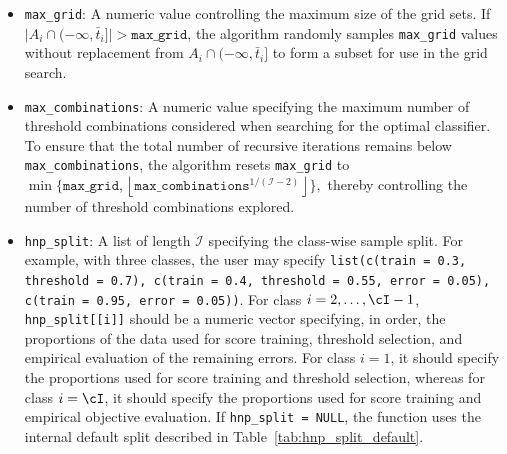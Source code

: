 \begin{itemize}
\item \texttt{max\_grid}: A numeric value controlling the maximum size of the grid sets. If \(\lvert A_i \cap (-\infty, \bar{t}_i] \rvert > \texttt{max\_grid}\), the algorithm randomly samples \texttt{max\_grid} values without replacement from \(A_i \cap (-\infty, \bar{t}_i]\) to form a subset for use in the grid search.



\item \texttt{max\_combinations}: A numeric value specifying the maximum number of threshold combinations considered when searching for the optimal classifier. To ensure that the total number of recursive iterations remains below \texttt{max\_combinations}, the algorithm resets \texttt{max\_grid} to
\(
\min\{\texttt{max\_grid}, \left\lfloor \texttt{max\_combinations}^{1/(\mathcal{I}-2)} \right\rfloor \},
\)
thereby controlling the number of threshold combinations explored.



\item \texttt{hnp\_split}: A list of length \(\mathcal{I}\) specifying the class-wise sample split. For example, with three classes, the user may specify
\texttt{list(c(train = 0.3, threshold = 0.7), c(train = 0.4, threshold = 0.55, error = 0.05), c(train = 0.95, error = 0.05))}. For class \(i = 2, \ldots, \cI - 1\), \texttt{hnp\_split[[i]]} should be a numeric vector specifying, in order, the proportions of the data used for score training, threshold selection, and empirical evaluation of the remaining errors. For class \(i = 1\), it should specify the proportions used for score training and threshold selection, whereas for class \(i = \cI\), it should specify the proportions used for score training and empirical objective evaluation. If \texttt{hnp\_split = NULL}, the function uses the internal default split described in Table~\ref{tab:hnp_split_default}.

    

\end{itemize}

